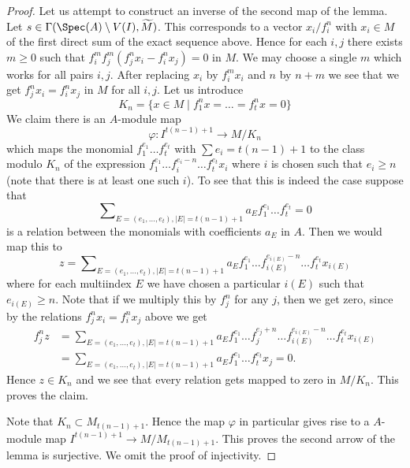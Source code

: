 \begin{proof}
\medskip\noindent
Let us attempt to construct an inverse of the second map of the lemma.
Let $s \in \Gamma(\Spec(A) \setminus V(I), \widetilde{M})$.
This corresponds to a vector $x_i/f_i^n$ with $x_i \in M$ of the
first direct sum of the exact sequence above.
Hence for each $i, j$ there exists $m \geq 0$
such that $f_i^m f_j^m (f_j^n x_i - f_i^n x_j) = 0$ in $M$.
We may choose a single $m$ which works for all pairs $i, j$.
After replacing $x_i$ by $f_i^mx_i$ and $n$ by $n + m$ we see
that we get $f_j^nx_i = f_i^nx_j$ in $M$ for all $i, j$.
Let us introduce
$$
K_n = \{x \in M \mid f_1^nx = \ldots = f_t^nx = 0\}
$$
We claim there is an $A$-module map
$$
\varphi :
I^{t(n - 1) + 1}
\longrightarrow
M/K_n
$$
which maps the monomial
$f_1^{e_1} \ldots f_t^{e_t}$ with $\sum e_i = t(n - 1) + 1$
to the class modulo $K_n$ of the expression
$f_1^{e_1} \ldots f_i^{e_i - n} \ldots f_t^{e_t}x_i$
where $i$ is chosen such that $e_i \geq n$ (note that there
is at least one such $i$).
To see that this is indeed the case suppose that
$$
\sum\nolimits_{E = (e_1, \ldots, e_t), |E| = t(n - 1) + 1}
a_E f_1^{e_1} \ldots f_t^{e_t} = 0
$$
is a relation between the monomials with coefficients $a_E$ in $A$.
Then we would map this to
$$
z =
\sum\nolimits_{E = (e_1, \ldots, e_t), |E| = t(n - 1) + 1}
a_E f_1^{e_1} \ldots f_{i(E)}^{e_{i(E)} - n} \ldots f_t^{e_t}x_{i(E)}
$$
where for each multiindex $E$ we have chosen a particular $i(E)$
such that $e_{i(E)} \geq n$.
Note that if we multiply this by $f_j^n$ for any $j$, then
we get zero, since by the relations $f_j^nx_i = f_i^nx_j$ above we get
\begin{align*}
f_j^nz & = \sum\nolimits_{E = (e_1, \ldots, e_t), |E| = t(n - 1) + 1}
a_E f_1^{e_1} \ldots f_j^{e_j + n}
\ldots f_{i(E)}^{e_{i(E)} - n} \ldots f_t^{e_t}x_{i(E)} \\
& =
\sum\nolimits_{E = (e_1, \ldots, e_t), |E| = t(n - 1) + 1}
a_E f_1^{e_1} \ldots f_t^{e_t}x_j
= 0.
\end{align*}
Hence $z \in K_n$ and we see that every relation gets mapped to zero
in $M/K_n$. This proves the claim.

\medskip\noindent
Note that $K_n \subset M_{t(n - 1) + 1}$. Hence the
map $\varphi$ in particular gives rise to a $A$-module map
$I^{t(n - 1) + 1} \to M/M_{t(n - 1) + 1}$.
This proves the second arrow of the lemma is surjective.
We omit the proof of injectivity.
\end{proof}

